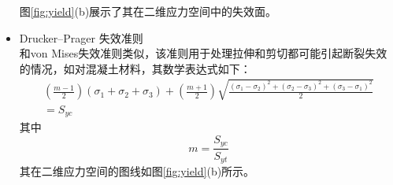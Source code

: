 \begin{itemize}
 	图\ref{fig:yield}(b)展示了其在二维应力空间中的失效面。
	\item Drucker–Prager 失效准则\\
	和von Mises失效准则类似，该准则用于处理拉伸和剪切都可能引起断裂失效的情况，如对混凝土材料，其数学表达式如下：
	\begin{multline}
	\left(\frac{m-1}{2}\right)(\sigma_1 + \sigma_2 + \sigma_3 )+\left(\frac{m+1}{2}\right)
	\sqrt{\frac{(\sigma_1-\sigma_2)^2+(\sigma_2-\sigma_3)^2+(\sigma_3-\sigma_1)^2}{2}}\\
	=S_{yc}
	\end{multline}  
	其中
	\begin{equation}
	m = \frac{S_{yc}}{S_{yt}}
	\end{equation}
	其在二维应力空间的图线如图\ref{fig:yield}(b)所示。
\end{itemize}


